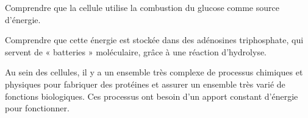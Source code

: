 \tetePremStssBiom
{}

\begin{objectifs}
  \item Comprendre que la cellule utilise la combustion du glucose comme source d'énergie.
  \item Comprendre que cette énergie est stockée dans des adénosines triphosphate, qui servent de « batteries » moléculaire, grâce à une réaction d'hydrolyse.
\end{objectifs}

\begin{contexte}
  Au sein des cellules, il y a un ensemble très complexe de processus chimiques et physiques pour fabriquer des protéines et assurer un ensemble très varié de fonctions biologiques.
  Ces processus ont besoin d'un apport constant d'énergie pour fonctionner.

\end{contexte}


